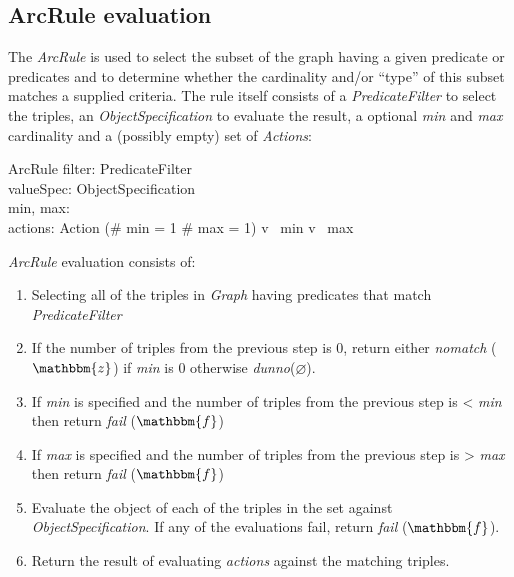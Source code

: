 \documentclass[fuzz]{llncs}
\def\fail{{\mathbbm{f}}}
\def\dunno{\varnothing}
\def\nomatch{\mathbbm{z}}
\def\zc{\textit}
\begin{document}
\subsection{ArcRule evaluation}
The \zc{ArcRule} is used to select the subset of the graph having a given predicate or
predicates and to determine whether the cardinality and/or ``type'' of this subset matches
a supplied criteria. The rule itself consists of a \zc{PredicateFilter} to select the triples,
 an \zc{ObjectSpecification} to evaluate the result, a optional \zc{min} and \zc{max}
 cardinality and a (possibly empty) set of \zc{Actions}:
\begin{schema}{ArcRule}
   filter: PredicateFilter \\
   valueSpec: ObjectSpecification \\
   min, max: \optional[\nat] \\
   actions: \power Action
\where
   (\# min = 1 \land \# max = 1) \implies v~ min \leq v~ max
\end{schema}
\zc{ArcRule} evaluation consists of:
\begin{enumerate}
\item Selecting all of the triples in \zc{Graph} having predicates that match  \zc{PredicateFilter}
\item If the number of triples from the previous step is 0, return either \zc{nomatch}
($\nomatch$) if \zc{min} is 0 otherwise \zc{dunno}($\dunno$).
\item If \zc{min} is specified and the number of triples from the previous step is < \zc{min}
then return \zc{fail} ($\fail$)
\item If \zc{max} is specified and the number of triples from the previous step is > \zc{max}
then return \zc{fail} ($\fail$)
\item Evaluate the object of each of the triples in the set against \zc{ObjectSpecification}.  If any of the evaluations fail, return \zc{fail} ($\fail$).
\item Return the result of evaluating \zc{actions} against the matching triples.
\end{enumerate}
\end{document}
